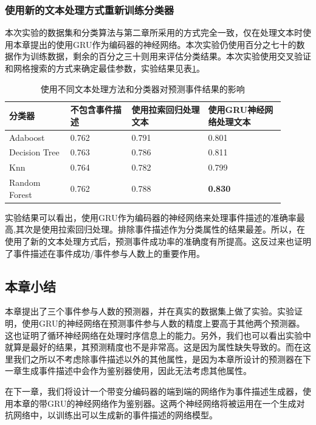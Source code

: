 \documentclass[12pt]{template}
\begin{document}
\subsubsection{使用新的文本处理方式重新训练分类器}\label{train_discrimiator}
本次实验的数据集和分类算法与第二章所采用的方式完全一致，仅在处理文本时使用本章提出的使用GRU作为编码器的神经网络。本次实验仍使用百分之七十的数据作为训练数据，剩余的百分之三十则用来评估分类结果。本次实验使用交叉验证和网格搜索的方式来确定最佳参数，实验结果见表\ref{t2-2}。

\begin{table}[htb] 
    \centering
    \caption{\label{t2-2}使用不同文本处理方法和分类器对预测事件结果的影响}
    \begin{tabular*}{\linewidth}{p{0.2\linewidth}p{0.2\linewidth}p{0.25\linewidth}p{0.25\linewidth}}
\toprule 
分类器&不包含事件描述&使用拉索回归处理文本&使用GRU神经网络处理文本\\
\midrule
Adaboost & 0.762 & 0.791 & 0.801 \\
Decision Tree& 0.763 & 0.786 & 0.811\\
Knn & 0.764 & 0.782 & 0.799 \\
Random Forest & 0.762 & 0.788 & \textbf{0.830} \\
\bottomrule
    \end{tabular*}
\end{table}

实验结果可以看出，使用$\mathrm{GRU}$作为编码器的神经网络来处理事件描述的准确率最高,其次是使用拉索回归处理。排除事件描述作为分类属性的结果最差。所以，在使用了新的文本处理方式后，预测事件成功率的准确度有所提高。这反过来也证明了事件描述在事件成功/事件参与人数上的重要作用。
\subsection{本章小结}
本章提出了三个事件参与人数的预测器，并在真实的数据集上做了实验。实验证明，使用GRU的神经网络在预测事件参与人数的精度上要高于其他两个预测器。这也证明了循环神经网络在处理时序信息上的能力。另外，我们也可以看出实验中就算是最好的结果，其预测精度也不是非常高。这是因为属性缺失导致的。而在这里我们之所以不考虑除事件描述以外的其他属性，是因为本章所设计的预测器在下一章生成事件描述中会作为鉴别器使用，因此无法考虑其他属性。

在下一章，我们将设计一个带变分编码器的端到端的网络作为事件描述生成器，使用本章的带GRU的神经网络作为鉴别器。这两个神经网络将被运用在一个生成对抗网络中，以训练出可以生成新的事件描述的网络模型。
\end{document}
